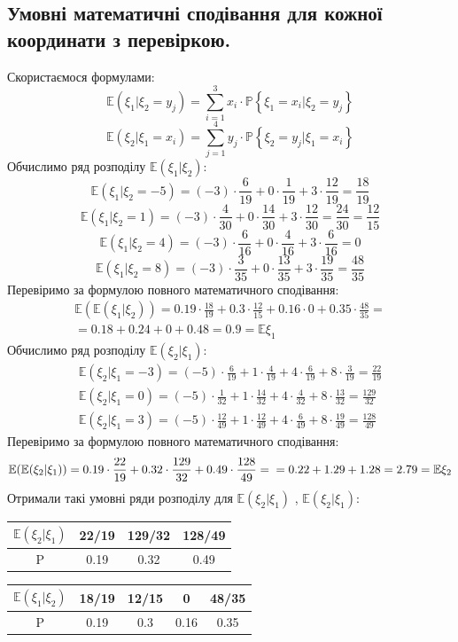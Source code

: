 \documentclass[14pt,a4paper]{scrartcl}
\theoremstyle{definition}
\theoremstyle{remark}
\theoremstyle{definition}
\theoremstyle{definition}
\begin{document}
\subsection{Умовні математичні сподівання для кожної координати з
перевіркою.}
Скористаємося формулами:
$$
\mathbb{E}(\xi_1 | \xi_2 =  y_j) =  \sum\limits_{i = 1}^{ 3}{ x_i \cdot \mathbb{P} \left\lbrace \xi_1 = x_i | \xi_2 = y_j \right\rbrace}
$$
$$
\mathbb{E}(\xi_2 | \xi_1 = x_i) =  \sum\limits_{j = 1}^{ 4}{ y_j  \cdot\mathbb{P} \left\lbrace \xi_2 = y_j | \xi_1 = x_i \right\rbrace}
$$
Обчислимо ряд розподілу $\mathbb{E}(\xi_1| \xi_2)$:
$$
\mathbb{E}(\xi_1| \xi_2 = -5) = (-3)\cdot\frac{6}{19}+0\cdot\frac{1}{19}+ 3\cdot\frac{12}{19} = \frac{18}{19}
$$
$$
\mathbb{E}(\xi_1| \xi_2 = 1) = (-3)\cdot\frac{4}{30}+0\cdot\frac{14}{30}+3\cdot\frac{12}{30} = \frac{24}{30} = \frac{12}{15}
$$
$$
\mathbb{E}(\xi_1| \xi_2 = 4) = (-3)\cdot\frac{6}{16}+0\cdot\frac{4}{16}+3\cdot\frac{6}{16} = 0
$$
$$
\mathbb{E}(\xi_1| \xi_2 = 8) = (-3)\cdot\frac{3}{35}+0\cdot\frac{13}{35}+3\cdot\frac{19}{35} = \frac{48}{35}
$$
Перевіримо за формулою повного математичного сподівання:
$$\begin{gathered}
 \mathbb{E}(\mathbb{E}(\xi_1 | \xi_2)) = 0.19\cdot\frac{18}{19} + 0.3 \cdot \frac{12}{15}  + 0.16\cdot 0 + 0.35 \cdot \frac{48}{35}  =\\ = 0.18 +  0.24 +0+ 0.48 = 0.9 = \mathbb{E} \xi_1
\end{gathered}$$
Обчислимо ряд розподілу $\mathbb{E}(\xi_2 | \xi_1)$:
$$
\begin{gathered}
\mathbb{E}(\xi_2| \xi_1 = -3) = (-5)\cdot\frac{6}{19}+ 1\cdot\frac{4}{19}+ 4\cdot\frac{6}{19} + 8\cdot\frac{3}{19}  = \frac{22}{19} \\
\mathbb{E}(\xi_2| \xi_1 = 0) =(-5)\cdot\frac{1}{32} + 1\cdot\frac{14}{32} + 4\cdot\frac{4}{32} + 8\cdot\frac{13}{32}  = \frac{129}{32} \\
\mathbb{E}(\xi_2| \xi_1 = 3) =(-5)\cdot\frac{12}{49} + 1\cdot\frac{12}{49} + 4\cdot\frac{6}{49} + 8\cdot\frac{19}{49} = \frac{128}{49}
\end{gathered}
$$
Перевіримо за формулою повного математичного сподівання:
$$
\mathbb{E}(\mathbb{E}(\xi_2 | \xi_1)) = 0.19 \cdot \frac{22}{19} + 0.32 \cdot \frac{129}{32} + 0.49 \cdot \frac{128}{49} = \\ = 0.22 + 1.29 + 1.28 = 2.79 = \mathbb{E}\xi_2
$$
Отримали такі умовні ряди розподілу для $\mathbb{E}(\xi_2 | \xi_1)$ , $\mathbb{E}(\xi_2 | \xi_1)$:
\begin{center}
\begin{tabular}{|c|c|c|c|}
\hline
$\mathbb{E}(\xi_2| \xi_1)$ & 22/19 & 129/32 & 128/49 \\ \hline
P & 0.19 & 0.32 & 0.49 \\ \hline
\end{tabular} \qquad
\begin{tabular}{|c|c|c|c|c|}
\hline
$\mathbb{E}(\xi_1| \xi_2)$ & 18/19 & 12/15 & 0 & 48/35 \\ \hline
P       & 0.19  & 0.3 & 0.16 & 0.35 \\ \hline
\end{tabular}
\end{center}
\end{document}
